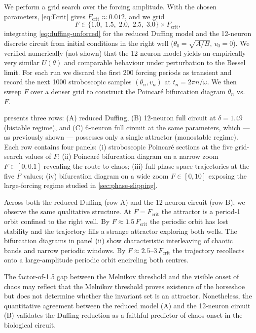 \documentclass[11pt, a4paper]{article}
\begin{document}
We perform a grid search over the forcing amplitude.  With the chosen parameters,
\cref{eq:Fcrit} gives $F_{\mathrm{crit}} \approx 0.012$, and we grid
%
\begin{equation}
\label{eq:F-grid}
F \in \{1.0,\; 1.5,\; 2.0,\; 2.5,\; 3.0\} \times F_{\mathrm{crit}},
\end{equation}
%
integrating \cref{eq:duffing-unforced} for the reduced Duffing model and the
12-neuron discrete circuit from initial conditions in the right well
($\theta_0 = \sqrt{A/B}$, $v_0 = 0$).  We verified numerically (not shown) that
the 12-neuron model yields an empirically very similar $U(\theta)$ and comparable
behaviour under perturbation to the Bessel limit.  For each run we discard the
first 200 forcing periods as transient and record the next 1000 stroboscopic
samples $(\theta_n, v_n)$ at $t_n = 2\pi n/\omega$.  We then sweep $F$ over a
denser grid to construct the Poincaré bifurcation diagram $\theta_n$ vs.\ $F$.

 presents three rows: (A) reduced Duffing, (B) 12-neuron full
circuit at $\delta = 1.49$ (bistable regime), and (C) 6-neuron full circuit at
the same parameters, which --- as previously shown --- possesses only a single
attractor (monostable regime).  Each row contains four panels: (i) stroboscopic
Poincaré sections at the five grid-search values of $F$; (ii) Poincaré
bifurcation diagram on a narrow zoom $F \in [0, 0.1]$ revealing the route to
chaos; (iii) full phase-space trajectories at the five $F$ values; (iv)
bifurcation diagram on a wide zoom $F \in [0, 10]$ exposing the large-forcing
regime studied in \cref{sec:phase-slipping}.

Across both the reduced Duffing (row A) and the 12-neuron circuit (row B), we
observe the same qualitative structure.  At $F = F_{\mathrm{crit}}$ the attractor
is a period-1 orbit confined to the right well.  By $F \approx
1.5\,F_{\mathrm{crit}}$ the periodic orbit has lost stability and the trajectory
fills a strange attractor exploring both wells.  The bifurcation diagrams in
panel (ii) show characteristic interleaving of chaotic bands and narrow periodic
windows.  By $F \approx 2.5$--$3\,F_{\mathrm{crit}}$ the trajectory recollects
onto a large-amplitude periodic orbit encircling both centres.

The factor-of-1.5 gap between the Melnikov threshold and the visible onset of
chaos may reflect that the Melnikov threshold proves existence of the horseshoe
but does not determine whether the invariant set is an attractor.  Nonetheless,
the quantitative agreement between the reduced model (A) and the 12-neuron
circuit (B) validates the Duffing reduction as a faithful predictor of chaos
onset in the biological circuit.
\end{document}
